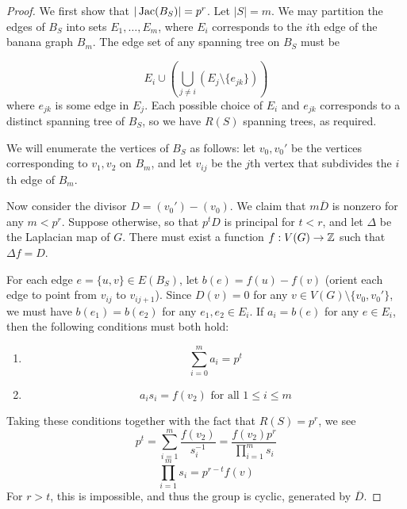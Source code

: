 \documentclass{amsart}
\begin{document}
\begin{proof}
  We first show that $|\operatorname{Jac}(B_S)| = p^r$. Let $|S| = m$. We may
  partition the edges of $B_S$ into sets $E_1, \ldots, E_m$, where
  $E_i$ corresponds to the $i$th edge of the banana graph $B_m$. The
  edge set of any spanning tree on $B_S$ must be

  \begin{equation*}
    E_i \cup \left(\bigcup_{j \ne i} (E_j \setminus \{e_{jk}\})\right)
  \end{equation*}
  where $e_{jk}$ is some edge in $E_j$. Each possible choice of $E_i$
  and $e_{jk}$ corresponds to a distinct spanning tree of $B_S$, so we
  have $R(S)$ spanning trees, as required.

  We will enumerate the vertices of $B_S$ as follows: let $v_0, v_0'$
  be the vertices corresponding to $v_1, v_2$ on $B_m$, and let
  $v_{ij}$ be the $j$th vertex that subdivides the $i$th edge of
  $B_m$.

  Now consider the divisor $D = (v_0') - (v_0)$. We claim that
  $m\overline{D}$ is nonzero for any $m < p^r$. Suppose otherwise, so
  that $p^tD$ is principal for $t < r$, and let $\Delta$ be the
  Laplacian map of $G$. There must exist a function $f:V(G) \to \mathbb{Z}$
  such that $\Delta f = D$.

  For each edge $e = \{u, v\} \in E(B_S)$, let $b(e) = f(u) - f(v)$
  (orient each edge to point from $v_{ij}$ to $v_{ij+1}$). Since $D(v)
  = 0$ for any $v \in V(G) \setminus \{v_0, v_0'\}$, we must have
  $b(e_1) = b(e_2)$ for any $e_1, e_2 \in E_i$.  If $a_i = b(e)$ for
  any $e \in E_i$, then the following conditions must both hold:
  
  \begin{enumerate}
    \item 
      \[
      \sum_{i=0}^m a_i = p^t
      \]
    \item
      \[
      a_is_i = f(v_2) \textrm{ for all } 1 \le i \le m
      \]
  \end{enumerate}

  Taking these conditions together with the fact that $R(S) = p^r$, we
  see
  \begin{equation*}
    p^t = \sum_{i=1}^m \frac{f(v_2)}{s_i^{-1}} = 
    \frac{f(v_2) p^r}{\prod_{i=1}^ms_i}
  \end{equation*}
  \begin{equation*}
    \prod_{i=1}^ms_i = p^{r-t}f(v)
  \end{equation*}
  For $r > t$, this is impossible, and thus the group is cyclic,
  generated by $\overline{D}$. 


\end{proof}
\end{document}
